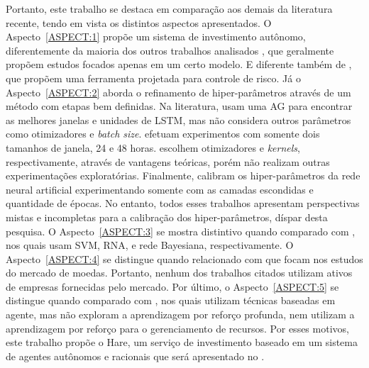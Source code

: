 Portanto, este trabalho se destaca em comparação aos demais da literatura recente, tendo em vista os distintos aspectos apresentados. O Aspecto~\ref{ASPECT:1} propõe um sistema de investimento autônomo, diferentemente da maioria dos outros trabalhos analisados \cite{random_forest_macroeconomic, fusionportifolio, ga_optimized_lstm, forecasting_bayesian}, que geralmente propõem estudos focados apenas em um certo modelo. E diferente também de \textcite{airms}, que propõem uma ferramenta projetada para controle de risco. Já o Aspecto~\ref{ASPECT:2} aborda o refinamento de hiper-parâmetros através de um método com etapas bem definidas. Na literatura, \textcite{ga_optimized_lstm} usam uma \acrshort{AG} para encontrar as melhores janelas e unidades de LSTM, mas não considera outros parâmetros como otimizadores e \emph{batch size}. \textcite{forecasting_bayesian} efetuam experimentos com somente dois tamanhos de janela, 24 e 48 horas. \textcite{random_forest_macroeconomic, fusionportifolio} escolhem otimizadores e \emph{kernels}, respectivamente, através de vantagens teóricas, porém não realizam outras experimentações exploratórias. Finalmente, \textcite{airms} calibram os hiper-parâmetros da rede neural artificial experimentando somente com as camadas escondidas e quantidade de épocas. No entanto, todos esses trabalhos apresentam perspectivas mistas e incompletas para a calibração dos hiper-parâmetros, díspar desta pesquisa. O Aspecto~\ref{ASPECT:3} se mostra distintivo quando comparado com \cite{fusionportifolio, airms, forecasting_bayesian}, nos quais usam \acrshort{SVM}, \acrshort{RNA}, e rede Bayesiana, respectivamente. O Aspecto~\ref{ASPECT:4} se distingue quando relacionado com \textcite{forecasting_bayesian, ga_optimized_lstm, fusionportifolio} que focam nos estudos do mercado de moedas. Portanto, nenhum dos trabalhos citados utilizam ativos de empresas fornecidas pelo mercado. Por último, o Aspecto~\ref{ASPECT:5} se distingue quando comparado com \cite{cryptocurrency, ftgame}, nos quais utilizam técnicas baseadas em agente, mas não exploram a aprendizagem por reforço profunda, nem utilizam a aprendizagem por reforço para o gerenciamento de recursos. Por esses motivos, este trabalho propõe o Hare, um serviço de investimento baseado em um sistema de agentes autônomos e racionais que será apresentado no .


